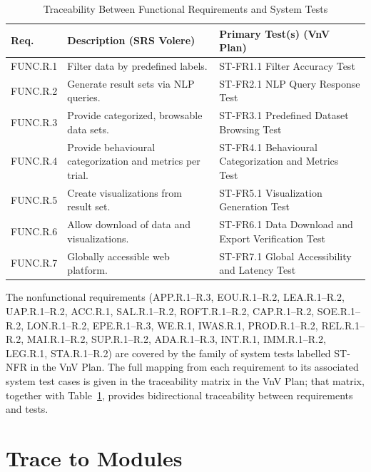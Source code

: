 \documentclass[12pt, titlepage]{article}
\begin{document}
\begin{table}[h!]
  \centering
  \caption{Traceability Between Functional Requirements and System Tests}
  \label{TblTraceReqToTestsFunc}
  \renewcommand{\arraystretch}{1.2}
  \footnotesize
  \begin{tabular}{p{1.4cm}>{\RaggedRight\arraybackslash}p{5.2cm}>{\RaggedRight\arraybackslash}p{5.2cm}}
    \toprule
    \textbf{Req.} & \textbf{Description (SRS Volere)} & \textbf{Primary Test(s) (VnV Plan)} \\
    \midrule
    FUNC.R.1 & Filter data by predefined labels. & ST-FR1.1 Filter Accuracy Test \\
    FUNC.R.2 & Generate result sets via NLP queries. & ST-FR2.1 NLP Query Response Test \\
    FUNC.R.3 & Provide categorized, browsable data sets. & ST-FR3.1 Predefined Dataset Browsing Test \\
    FUNC.R.4 & Provide behavioural categorization and metrics per trial. & ST-FR4.1 Behavioural Categorization and Metrics Test \\
    FUNC.R.5 & Create visualizations from result set. & ST-FR5.1 Visualization Generation Test \\
    FUNC.R.6 & Allow download of data and visualizations. & ST-FR6.1 Data Download and Export Verification Test \\
    FUNC.R.7 & Globally accessible web platform. & ST-FR7.1 Global Accessibility and Latency Test \\
    \bottomrule
  \end{tabular}
\end{table}

The nonfunctional requirements (APP.R.1--R.3, EOU.R.1--R.2, LEA.R.1--R.2, UAP.R.1--R.2,
ACC.R.1, SAL.R.1--R.2, ROFT.R.1--R.2, CAP.R.1--R.2, SOE.R.1--R.2, LON.R.1--R.2, EPE.R.1--R.3,
WE.R.1, IWAS.R.1, PROD.R.1--R.2, REL.R.1--R.2, MAI.R.1--R.2, SUP.R.1--R.2, ADA.R.1--R.3,
INT.R.1, IMM.R.1--R.2, LEG.R.1, STA.R.1--R.2) are covered by the family of system
tests labelled ST-NFR in the VnV Plan.  The full mapping from each
requirement to its associated system test cases is given in the traceability
matrix in the VnV Plan; that matrix, together with Table~\ref{TblTraceReqToTestsFunc}, provides bidirectional
traceability between requirements and tests.

\section{Trace to Modules}
\label{sec:trace-mod}
\end{document}
